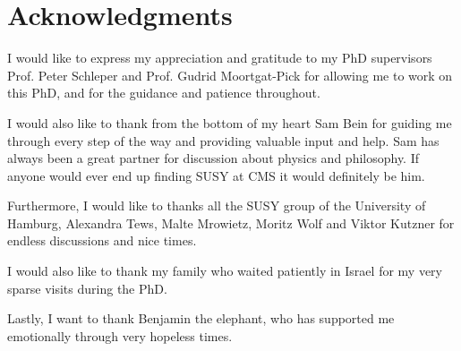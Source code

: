 \chapter{Acknowledgments}

I would like to express my appreciation and gratitude to my PhD supervisors Prof. Peter Schleper and Prof. Gudrid Moortgat-Pick for allowing me to work on this PhD, and for the guidance and patience throughout.

I would also like to thank from the bottom of my heart Sam Bein for guiding me through every step of the way and providing valuable input and help. Sam has always been a great partner for discussion about physics and philosophy. If anyone would ever end up finding SUSY at CMS it would definitely be him.

Furthermore, I would like to thanks all the SUSY group of the University of Hamburg, Alexandra Tews, Malte Mrowietz, Moritz Wolf and Viktor Kutzner for endless discussions and nice times.

I would also like to thank my family who waited patiently in Israel for my very sparse visits during the PhD.

Lastly, I want to thank Benjamin the elephant, who has supported me emotionally through very hopeless times. 